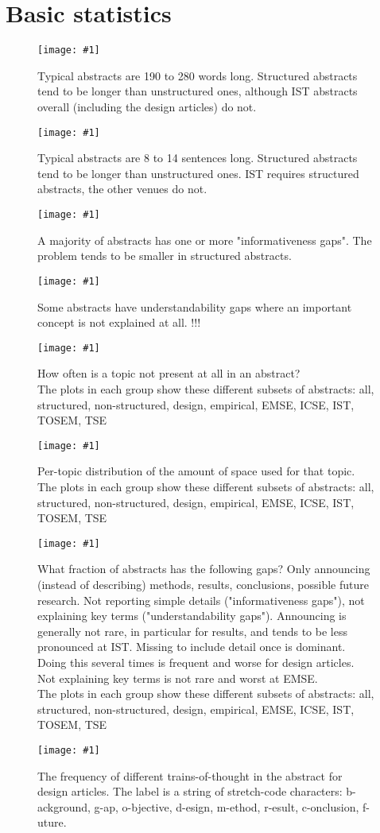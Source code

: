 \documentclass[10pt,journal,compsoc]{IEEEtran}
\newcommand{\Plot}[2]{%
	\begin{figure}[!t]%
		\centering\texttt{[image: \#1]}%
		\vspace{-4mm}\caption{#2}\label{#1}%
	\end{figure}}
\newcommand{\Plotwide}[2]{%
	\begin{figure*}%
		\centering\texttt{[image: \#1]}%
		\vspace{-4mm}\caption{#2}\label{#1}%
    \end{figure*}}
\begin{document}
\appendix
\section{Basic statistics}

\Plot{boxplots_words}{%
  Typical abstracts are 190 to 280 words long. 
  Structured abstracts tend to be longer than unstructured ones, 
  although IST abstracts overall (including the design articles) do not.}
\Plot{boxplots_sentences}{%
	Typical abstracts are 8 to 14 sentences long.
	Structured abstracts tend to be longer than unstructured ones.
	IST requires structured abstracts, the other venues do not.}
\Plot{boxplots_icount}{%
  A majority of abstracts has one or more "informativeness gaps".
  The problem tends to be smaller in structured abstracts.}
\Plot{boxplots_ucount}{%
  Some abstracts have understandability gaps where an important concept is not explained at all.
  !!!}
\Plotwide{zerofractionbar_xletgroups_topicmissingfractions}{%
	How often is a topic not present at all in an abstract?\\
	The plots in each group show these different subsets of abstracts:
	all, structured, non-structured, design, empirical, EMSE, ICSE, IST, TOSEM, TSE}
\Plotwide{box_xletgroups_topicfractions}{%
	Per-topic distribution of the amount of space used for that topic.\\
	The plots in each group show these different subsets of abstracts:
	all, structured, non-structured, design, empirical, EMSE, ICSE, IST, TOSEM, TSE}
\Plotwide{nonzerofractionbar_xletgroups_missinginfofractions}{%
	What fraction of abstracts has the following gaps?
	Only announcing (instead of describing) methods, results, conclusions, possible future research.
	Not reporting simple details ("informativeness gaps"), not explaining key terms ("understandability gaps").
	Announcing is generally not rare, in particular for results, and tends to be less pronounced
	at IST. 
	Missing to include detail once is dominant.
	Doing this several times is frequent and worse for design articles.
	Not explaining key terms is not rare and worst at EMSE.\\
	The plots in each group show these different subsets of abstracts:
	all, structured, non-structured, design, empirical, EMSE, ICSE, IST, TOSEM, TSE}
\Plot{ab_topicstructure_freqs_design}{%
  The frequency of different trains-of-thought in the abstract for design articles.
  The label is a string of stretch-code characters:
  b-ackground, g-ap, o-bjective, d-esign, m-ethod, r-esult, c-onclusion, f-uture.}
\end{document}
